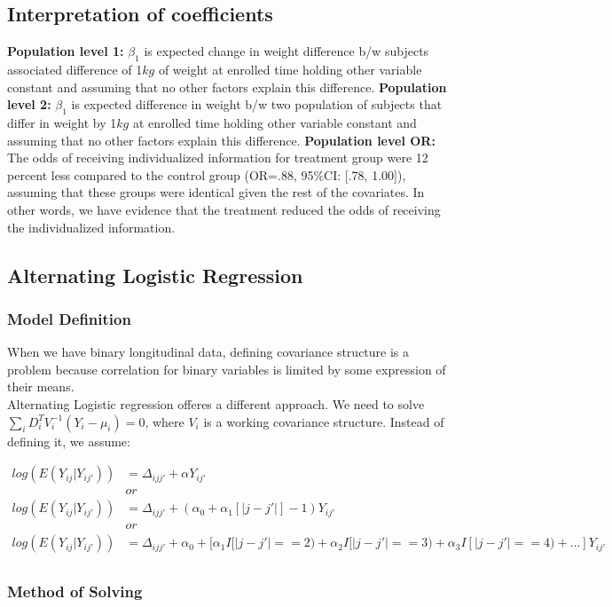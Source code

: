 \documentclass[]{article}
\begin{document}
	\subsection{Interpretation of coefficients}
	\textbf{Population level 1:} $\beta_1$ is expected change in weight difference b/w subjects associated difference of 1$kg$ of weight at enrolled time holding other variable constant and assuming that no other factors explain this difference.
	\textbf{Population level 2:} $\beta_1$ is expected difference in weight b/w two population of subjects that differ in weight by 1$kg$ at enrolled time holding other variable constant and assuming that no other factors explain this difference.
	\textbf{Population level OR:} The odds of receiving individualized information for treatment group were 12 percent less compared to the control group (OR=.88, 95\%CI: [.78, 1.00]), assuming that these groups were identical given the rest of the covariates. In other words, we have evidence that the treatment reduced the odds of receiving the individualized information.
	\subsection{Alternating Logistic Regression}

	\subsubsection{Model Definition}
When we have binary longitudinal data, defining covariance structure is a problem because correlation for binary variables is limited by some expression of their means. \\
Alternating Logistic regression offeres a different approach. We need to solve $\sum_i D_i^T V_i^{-1} (Y_i - \mu_i) = 0$, where $V_i$ is a working covariance structure. Instead of defining it, we assume:

$$
\begin{aligned}
	log(E(Y_{ij}|Y_{ij'})) &= \Delta_{ijj'} + \alpha Y_{ij'}\\
	&or\\
	log(E(Y_{ij}|Y_{ij'})) &= \Delta_{ijj'} + (\alpha_0 + \alpha_1[|j-j'|]-1) Y_{ij'}\\
	&or\\
	log(E(Y_{ij}|Y_{ij'})) &= \Delta_{ijj'} + \alpha_0 + [\alpha_1I[|j-j'|==2) + \alpha_2I[|j-j'|==3) + \alpha_3I[|j-j'|==4) + ...] Y_{ij'}\\
\end{aligned}
$$
	\subsubsection{Method of Solving}
\end{document}
